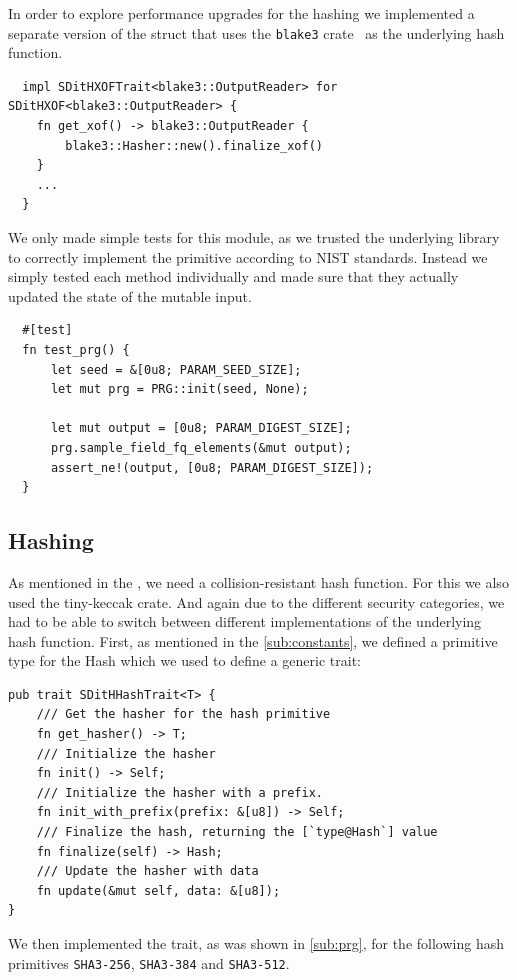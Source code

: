 \documentclass[11pt]{report}
\theoremstyle{definition}
\theoremstyle{plain}
\begin{document}
In order to explore performance upgrades for the hashing we implemented a separate version of the  struct that uses the \texttt{blake3} crate~\cite{blakethree} as the underlying hash function.

\begin{verbatim}
  impl SDitHXOFTrait<blake3::OutputReader> for SDitHXOF<blake3::OutputReader> {
    fn get_xof() -> blake3::OutputReader {
        blake3::Hasher::new().finalize_xof()
    }
    ...
  }
\end{verbatim}

We only made simple tests for this module, as we trusted the underlying library to correctly implement the primitive according to NIST standards. Instead we simply tested each method individually and made sure that they actually updated the state of the mutable input.

\begin{verbatim}
  #[test]
  fn test_prg() {
      let seed = &[0u8; PARAM_SEED_SIZE];
      let mut prg = PRG::init(seed, None);

      let mut output = [0u8; PARAM_DIGEST_SIZE];
      prg.sample_field_fq_elements(&mut output);
      assert_ne!(output, [0u8; PARAM_DIGEST_SIZE]);
  }
\end{verbatim}

\subsection{Hashing}\label{sec:hashing} %
As mentioned in the , we need a collision-resistant hash function. For this we also used the tiny-keccak crate. And again due to the different security categories, we had to be able to switch between different implementations of the underlying hash function.
First, as mentioned in the \autoref{sub:constants}, we defined a primitive type for the Hash which we used to define a generic trait:
\begin{verbatim}
pub trait SDitHHashTrait<T> {
    /// Get the hasher for the hash primitive
    fn get_hasher() -> T;
    /// Initialize the hasher
    fn init() -> Self;
    /// Initialize the hasher with a prefix. 
    fn init_with_prefix(prefix: &[u8]) -> Self;
    /// Finalize the hash, returning the [`type@Hash`] value
    fn finalize(self) -> Hash;
    /// Update the hasher with data
    fn update(&mut self, data: &[u8]);
}
\end{verbatim}
We then implemented the trait, as was shown in \autoref{sub:prg}, for the following hash primitives \texttt{SHA3-256}, \texttt{SHA3-384} and \texttt{SHA3-512}.
\end{document}
